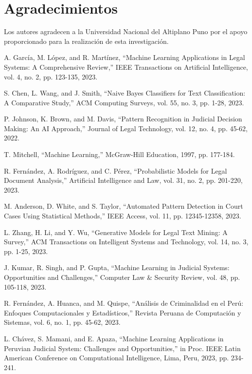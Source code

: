 \documentclass[conference]{IEEEtran}
\begin{document}
\section*{Agradecimientos}

Los autores agradecen a la Universidad Nacional del Altiplano Puno por el apoyo proporcionado para la realización de esta investigación.

\begin{thebibliography}{00}
 A. García, M. López, and R. Martínez, ``Machine Learning Applications in Legal Systems: A Comprehensive Review,'' IEEE Transactions on Artificial Intelligence, vol. 4, no. 2, pp. 123-135, 2023.

 S. Chen, L. Wang, and J. Smith, ``Naive Bayes Classifiers for Text Classification: A Comparative Study,'' ACM Computing Surveys, vol. 55, no. 3, pp. 1-28, 2023.

 P. Johnson, K. Brown, and M. Davis, ``Pattern Recognition in Judicial Decision Making: An AI Approach,'' Journal of Legal Technology, vol. 12, no. 4, pp. 45-62, 2022.

 T. Mitchell, ``Machine Learning,'' McGraw-Hill Education, 1997, pp. 177-184.

 R. Fernández, A. Rodríguez, and C. Pérez, ``Probabilistic Models for Legal Document Analysis,'' Artificial Intelligence and Law, vol. 31, no. 2, pp. 201-220, 2023.

 M. Anderson, D. White, and S. Taylor, ``Automated Pattern Detection in Court Cases Using Statistical Methods,'' IEEE Access, vol. 11, pp. 12345-12358, 2023.

 L. Zhang, H. Li, and Y. Wu, ``Generative Models for Legal Text Mining: A Survey,'' ACM Transactions on Intelligent Systems and Technology, vol. 14, no. 3, pp. 1-25, 2023.

 J. Kumar, R. Singh, and P. Gupta, ``Machine Learning in Judicial Systems: Opportunities and Challenges,'' Computer Law \& Security Review, vol. 48, pp. 105-118, 2023.

 R. Fernández, A. Huanca, and M. Quispe, ``Análisis de Criminalidad en el Perú: Enfoques Computacionales y Estadísticos,'' Revista Peruana de Computación y Sistemas, vol. 6, no. 1, pp. 45-62, 2023.

 L. Chávez, S. Mamani, and E. Apaza, ``Machine Learning Applications in Peruvian Judicial System: Challenges and Opportunities,'' in Proc. IEEE Latin American Conference on Computational Intelligence, Lima, Peru, 2023, pp. 234-241.

\end{thebibliography}
\end{document}
